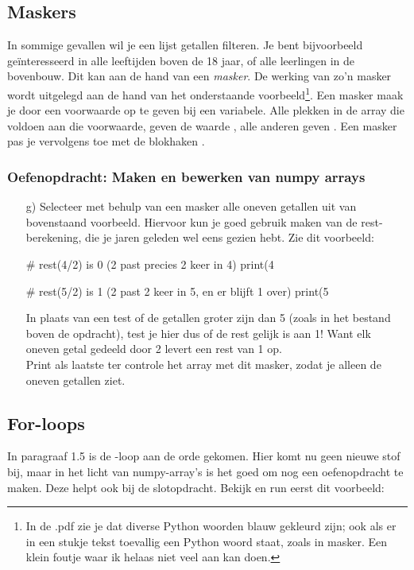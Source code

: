 \documentclass[a4paper,11pt, fleqn]{article}
\begin{document}
\subsection{Maskers}
In sommige gevallen wil je een lijst getallen filteren. Je bent bijvoorbeeld ge\"interesseerd in alle leeftijden boven de 18 jaar, of alle leerlingen in de bovenbouw. Dit kan aan de hand van een {\it masker}. De werking van zo'n masker wordt uitgelegd aan de hand van het onderstaande voorbeeld\footnote{In de .pdf zie je dat diverse Python woorden blauw gekleurd zijn; ook als er in een stukje tekst toevallig een Python woord staat, zoals in masker. Een klein foutje waar ik helaas niet veel aan kan doen.}.
Een masker maak je door een voorwaarde op te geven bij een variabele. Alle plekken in de array die voldoen aan die voorwaarde, geven de waarde , alle anderen geven . Een masker pas je vervolgens toe met de blokhaken \pythoninline{[ ]}.


\subsubsection*{Oefenopdracht: Maken en bewerken van numpy arrays}
\begin{itemize}
	\item[g)] Selecteer met behulp van een masker alle oneven getallen uit  van bovenstaand voorbeeld. Hiervoor kun je goed gebruik maken van de rest-berekening, die je jaren geleden wel eens gezien hebt. Zie dit voorbeeld:
	\begin{python}
# rest(4/2) is 0 (2 past precies 2 keer in 4)
print(4 %

# rest(5/2) is 1 (2 past 2 keer in 5, en er blijft 1 over)
print(5 %
	\end{python}
	In plaats van een test of de getallen groter zijn dan 5 (zoals in het bestand boven de opdracht), test je hier dus of de rest gelijk is aan 1! Want elk oneven getal gedeeld door 2 levert een rest van 1 op.\\
	Print als laatste ter controle het array met dit masker, zodat je alleen de oneven getallen ziet.
\end{itemize}

\iffalse
\subsection{For-loops}
In paragraaf 1.5 is de -loop aan de orde gekomen. Hier komt nu geen nieuwe stof bij, maar in het licht van numpy-array's is het goed om nog een oefenopdracht te maken. Deze helpt ook bij de slotopdracht. Bekijk en run eerst dit voorbeeld:
\end{document}
